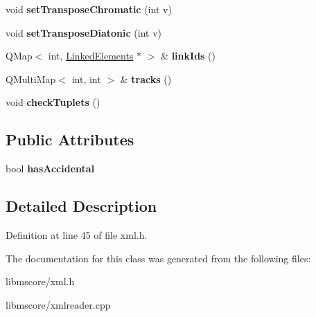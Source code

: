\begin{DoxyCompactItemize}
\item 
\mbox{\label{class_ms_1_1_xml_reader_ae06dd39ca1099eaffd79f3b029c03cc1}} 
void {\bfseries set\+Transpose\+Chromatic} (int v)
\item 
\mbox{\label{class_ms_1_1_xml_reader_aeafe68be3ce32d09ef60c8b7ca8d3a35}} 
void {\bfseries set\+Transpose\+Diatonic} (int v)
\item 
\mbox{\label{class_ms_1_1_xml_reader_aa932f23579a63558f89c353e246faf3e}} 
Q\+Map$<$ int, \hyperlink{class_ms_1_1_linked_elements}{Linked\+Elements} $\ast$ $>$ \& {\bfseries link\+Ids} ()
\item 
\mbox{\label{class_ms_1_1_xml_reader_a21bcd474929d41d5dab87bd80020a4af}} 
Q\+Multi\+Map$<$ int, int $>$ \& {\bfseries tracks} ()
\item 
\mbox{\label{class_ms_1_1_xml_reader_af71eb5a25341ba54c8957b835aafde54}} 
void {\bfseries check\+Tuplets} ()
\end{DoxyCompactItemize}
\subsection*{Public Attributes}
\begin{DoxyCompactItemize}
\item 
\mbox{\label{class_ms_1_1_xml_reader_a130362673b361e759a6befb1028b9b0e}} 
bool {\bfseries has\+Accidental}
\end{DoxyCompactItemize}


\subsection{Detailed Description}


Definition at line 45 of file xml.\+h.



The documentation for this class was generated from the following files\+:\begin{DoxyCompactItemize}
\item 
libmscore/xml.\+h\item 
libmscore/xmlreader.\+cpp\end{DoxyCompactItemize}
